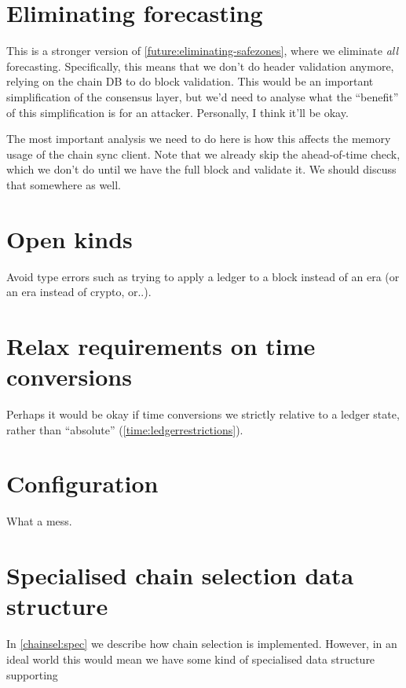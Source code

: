 \section{Eliminating forecasting}
\label{future:eliminating-forecasting}

This is a stronger version of \cref{future:eliminating-safezones}, where
we eliminate \emph{all} forecasting. Specifically, this means that we don't
do header validation anymore, relying on the chain DB to do block validation.
This would be an important simplification of the consensus layer, but we'd
need to analyse what the ``benefit'' of this simplification is for an
attacker. Personally, I think it'll be okay.

The most important analysis we need to do here is how this affects the memory
usage of the chain sync client. Note that we already skip the ahead-of-time
check, which we don't do until we have the full block and validate it. We
should discuss that somewhere as well.

\section{Open kinds}
\label{future:openkinds}

Avoid type errors such as trying to apply a ledger to a block instead of an era
(or an era instead of crypto, or..).

\section{Relax requirements on time conversions}
\label{future:relax-time-requirements}

Perhaps it would be okay if time conversions we strictly relative to a ledger
state, rather than ``absolute'' (\cref{time:ledgerrestrictions}).

\section{Configuration}

What a mess.

\section{Specialised chain selection data structure}

In \cref{chainsel:spec} we describe how chain selection is implemented. However,
in an ideal world this would mean we have some kind of specialised data
structure supporting

